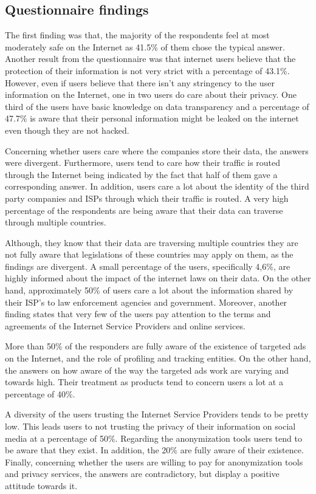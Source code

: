 \subsection{Questionnaire findings}

The first finding was that, the majority  of the respondents feel at most 
moderately safe on the Internet as 41.5\% of them chose the typical answer. 
Another result from the questionnaire was that internet users believe that the 
protection of their information is not very strict with a percentage of 43.1\%. 
However, even if users believe that there isn't any stringency to the user 
information on the Internet, one in two users do care about their privacy. 
One third of the users have basic knowledge on data transparency and a 
percentage of 47.7\% is aware that their personal information might be leaked on 
the internet even though they are not hacked. 

Concerning whether users care where the companies store their data, the answers 
were divergent. Furthermore, users  tend to care how their traffic is routed 
through the Internet being indicated by the fact that half of them gave a 
corresponding answer. In addition, users care a lot about the identity of the 
third party companies and ISPs through which their traffic is routed. 
A very high percentage of the respondents are being aware that their data can 
traverse through multiple countries. 

Although, they know that their data are traversing multiple countries they are 
not fully aware that legislations of these countries may apply on them, as the 
findings are divergent. A small percentage of the users, specifically 4,6\%, are 
highly informed about the impact of the internet laws on their data. 
On the other hand, approximately 50\% of users care a lot about  the information 
shared by their ISP's to law enforcement agencies and government. Moreover, 
another finding states that very few of the users pay attention to the terms and 
agreements of the Internet Service Providers and online services.

More than 50\% of the responders are fully aware of the existence of targeted 
ads on the Internet, and the role of profiling and tracking entities. On the 
other hand, the answers on how aware of the way the targeted ads work are 
varying and towards high. Their treatment as products tend to concern users a 
lot at a percentage of 40\%. 

A diversity of the users trusting the Internet Service Providers tends to be 
pretty low. This leads users to not trusting the privacy of their information on 
social media at a percentage of 50\%. Regarding the anonymization tools users 
tend to be aware that they exist. In addition, the 20\% are fully aware of their 
existence. Finally, concerning whether the users are willing to pay for 
anonymization tools and privacy services, the answers are contradictory, but 
display a positive attitude towards it.

